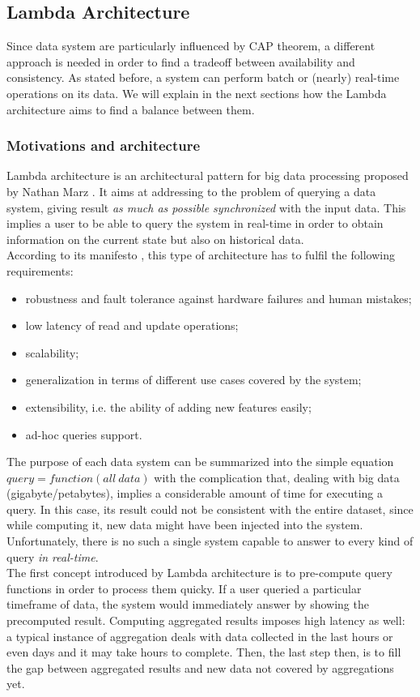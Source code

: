 \subsection{Lambda Architecture}
\label{lambda-architecture}
Since data system are particularly influenced by CAP theorem, a different approach is needed in order to find a tradeoff between availability and consistency. As stated before, a system can perform batch or (nearly) real-time operations on its data. We will explain in the next sections how the Lambda architecture aims to find a balance between them.
\subsubsection{Motivations and architecture}
Lambda architecture is an architectural pattern for big data processing proposed by Nathan Marz \cite{bib2}. It aims at addressing  to the problem of querying a data system, giving result \textit{as much as possible synchronized} with the input data. This implies a user to be able to query the system in real-time in order to obtain information on the current state but also on historical data. \\
According to its manifesto \cite{bib2}, this type of architecture has to fulfil the following requirements:
\begin{itemize}
\item robustness and fault tolerance against hardware failures and human mistakes;
\item low latency of read and update operations;
\item scalability;
\item generalization in terms of different use cases covered by the system;
\item extensibility, i.e. the ability of adding new features easily;
\item ad-hoc queries support.
\end{itemize}
The purpose of each data system can be summarized into the simple equation $query=function(all \: data)$ \cite{bib2} with the complication that, dealing with big data (gigabyte/petabytes), implies a considerable amount of time for executing a query. In this case, its result could not be consistent with the entire dataset, since while computing it, new data might have been injected into the system. Unfortunately, there is no such a single system capable to answer to every kind of query \textit{in real-time}.\\
The first concept introduced by Lambda architecture is to pre-compute query functions \cite{bib4} in order to process them quicky. If a user queried a particular timeframe of data, the system would immediately answer by showing the precomputed result. Computing aggregated results imposes high latency as well: a typical instance of aggregation deals with data collected in the last hours or even days and it may take hours to complete. Then, the last step then, is to fill the gap between aggregated results and new data not covered by aggregations yet.\\
